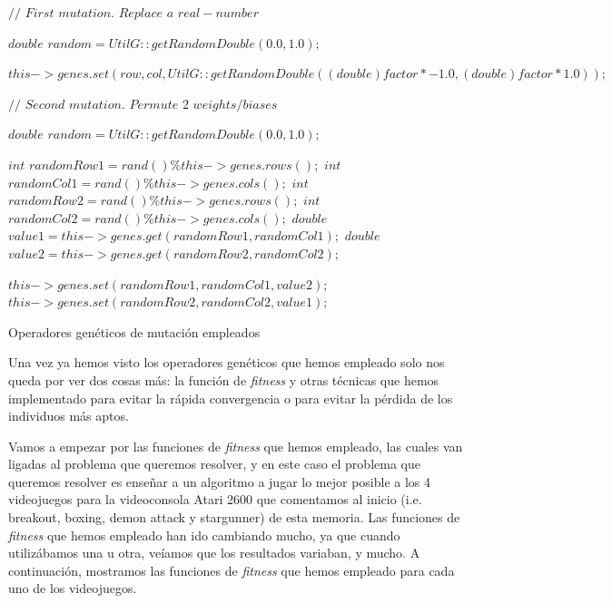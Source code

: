 \vspace{2mm}
\begin{algorithm}[H]
    
    $//$ $First$ $mutation.$ $Replace$ $a$ $real-number$
    
    {
        {
            $double$ $random = UtilG::getRandomDouble(0.0, 1.0);$

			{
				$this->genes.set(row, col, UtilG::getRandomDouble((double)factor * -1.0, (double)factor * 1.0));$
			}
        }
    }
    
    $//$ $Second$ $mutation.$ $Permute$ $2$ $weights/biases$
    
    {
        {
            $double$ $random = UtilG::getRandomDouble(0.0, 1.0);$

			{
                $int$ $randomRow1 = rand() \% this->genes.rows();$
                $int$ $randomCol1 = rand() \% this->genes.cols();$
                $int$ $randomRow2 = rand() \% this->genes.rows();$
                $int$ $randomCol2 = rand() \% this->genes.cols();$
                $double$ $value1 = this->genes.get(randomRow1, randomCol1);$
                $double$ $value2 = this->genes.get(randomRow2, randomCol2);$

                $this->genes.set(randomRow1, randomCol1, value2);$
                $this->genes.set(randomRow2, randomCol2, value1);$
			}
        }
    }
    
	\caption{Operadores genéticos de mutación empleados}
	\label{alg:mutationOperator}
\end{algorithm}

\newpage
Una vez ya hemos visto los operadores genéticos que hemos empleado solo nos queda por ver dos cosas más: la función de \textit{fitness} y otras técnicas que hemos implementado para evitar la rápida convergencia o para evitar la pérdida de los individuos más aptos.

Vamos a empezar por las funciones de \textit{fitness} que hemos empleado, las cuales van ligadas al problema que queremos resolver, y en este caso el problema que queremos resolver es enseñar a un algoritmo a jugar lo mejor posible a los 4 videojuegos para la videoconsola Atari 2600 que comentamos al inicio (i.e. breakout, boxing, demon attack y stargunner) de esta memoria. Las funciones de \textit{fitness} que hemos empleado han ido cambiando mucho, ya que cuando utilizábamos una u otra, veíamos que los resultados variaban, y mucho. A continuación, mostramos las funciones de \textit{fitness} que hemos empleado para cada uno de los videojuegos.

